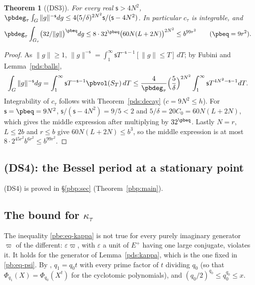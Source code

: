 \documentclass[10pt]{amsart}
\newtheorem{theorem}{Theorem}[section]
\theoremstyle{definition}
\theoremstyle{remark}
\begin{document}
\begin{theorem}[\textup{(DS3)}]\label{pds:tail}
For every real $\mathsf s>4N^2$, $\pbdeg_\tau\int_G\|g\|^{-\mathsf s}dg\le4(5/\delta)^{2N^2}\mathsf s/
(\mathsf s-4N^2)$. In particular $c_\tau$ is integrable, and
\[
\pbdeg_\tau\int_{G_\tau}\bigl(32/\|g\|\bigr)^{\pbeq}dg\le8\cdot32^{\pbeq}\bigl(60N(L+2N)\bigr)^{2N^2}
\le b^{99r^2}\qquad(\pbeq=9r^2).
\]
\end{theorem}
\begin{proof}
As $\|g\|\ge1$, $\|g\|^{-\mathsf s}=\int_1^\infty\mathsf sT^{-\mathsf s-1}[\|g\|\le T]\,dT$; by Fubini
and Lemma~\ref{pds:balls},
\[
\int_G\|g\|^{-\mathsf s}dg=\int_1^\infty\mathsf sT^{-\mathsf s-1}\pbvol(S_T)\,dT\le
\frac{4}{\pbdeg_\tau}\Bigl(\frac5\delta\Bigr)^{2N^2}\int_1^\infty\mathsf sT^{4N^2-\mathsf s-1}dT .
\]
Integrability of $c_\tau$ follows with Theorem~\ref{pds:decay} ($c=9N^2\le h$). For $\mathsf s=
\pbeq=9N^2$, $\mathsf s/(\mathsf s-4N^2)=9/5<2$ and $5/\delta=20C_0=60N(L+2N)$, which gives the
middle expression after multiplying by $32^{\pbeq}$. Lastly $N=r$, $L\le2b$ and $r\le b$ give
$60N(L+2N)\le b^3$, so the middle expression is at most $8\cdot2^{45r^2}b^{6r^2}\le b^{99r^2}$.
\end{proof}

\subsection{(DS4): the Bessel period at a stationary point}\label{pds:ss-ds4}

\smallskip\noindent\textup{(DS4)} is proved in \S\ref{pbp:sec} (Theorem~\ref{pbp:main}).\par\smallskip

\subsection{The bound for \texorpdfstring{$\kappa_\tau$}{kappa}}\label{pds:ss-kappa}

The inequality \eqref{pbe:eq-kappa} is not true for every purely imaginary generator $\varpi$ of the
different: $\varepsilon\varpi$, with $\varepsilon$ a unit of $E^+$ having one large conjugate,
violates it. It holds for the generator of Lemma~\ref{pds:kappa}, which is the one fixed in
\eqref{pb:eq-psi}. By {\cite[Lemma~13.4(S7)]{P46}}, $q_1=q_0t$ with every prime factor of $t$ dividing
$q_0$ (so that $\Phi_{q_1}(X)=\Phi_{q_0}(X^t)$ for the cyclotomic polynomials), and $(q_0/2)^{q_0}\le
q_0^{q_0}\le x$.
\end{document}
